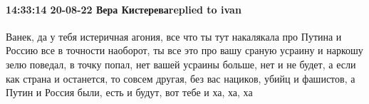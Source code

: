  
 
 
 
 

\paragraph{14:33:14 20-08-22 Вера Кистереваreplied to ivan}

Ванек, да у тебя истеричная агония, все что ты тут накалякала про Путина и
Россию все в точности наоборот, ты все это про вашу сраную усраину и наркошу
зелю поведал, в точку попал, нет вашей усраины больше, нет и не будет, а если
как страна и останется, то совсем другая, без вас нациков, убийц и фашистов, а
Путин и Россия были, есть и будут, вот тебе и ха, ха, ха
